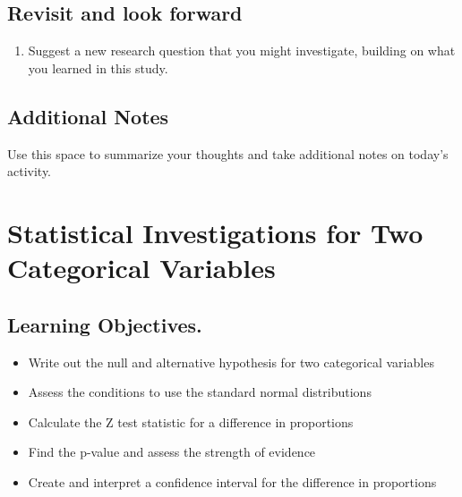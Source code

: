 \documentclass[
]{report}
\providecommand{\tightlist}{%
  \setlength{\itemsep}{0pt}\setlength{\parskip}{0pt}}
\begin{document}
\vspace{3in}

\hypertarget{revisit-and-look-forward}{%
\section{Revisit and look forward}\label{revisit-and-look-forward}}

\begin{enumerate}
\def\labelenumi{\arabic{enumi}.}
\setcounter{enumi}{28}
\tightlist
\item
  Suggest a new research question that you might investigate, building on what you learned in this study.
\end{enumerate}

\vspace{1in}

\hypertarget{additional-notes-5}{%
\section{Additional Notes}\label{additional-notes-5}}

Use this space to summarize your thoughts and take additional notes on today's activity.

\hypertarget{statistical-investigations-for-two-categorical-variables}{%
\chapter{Statistical Investigations for Two Categorical Variables}\label{statistical-investigations-for-two-categorical-variables}}

\hypertarget{learning-objectives.}{%
\section{Learning Objectives.}\label{learning-objectives.}}

\begin{itemize}
\item
  Write out the null and alternative hypothesis for two categorical variables
\item
  Assess the conditions to use the standard normal distributions
\item
  Calculate the Z test statistic for a difference in proportions
\item
  Find the p-value and assess the strength of evidence
\item
  Create and interpret a confidence interval for the difference in proportions
\end{itemize}
\end{document}
